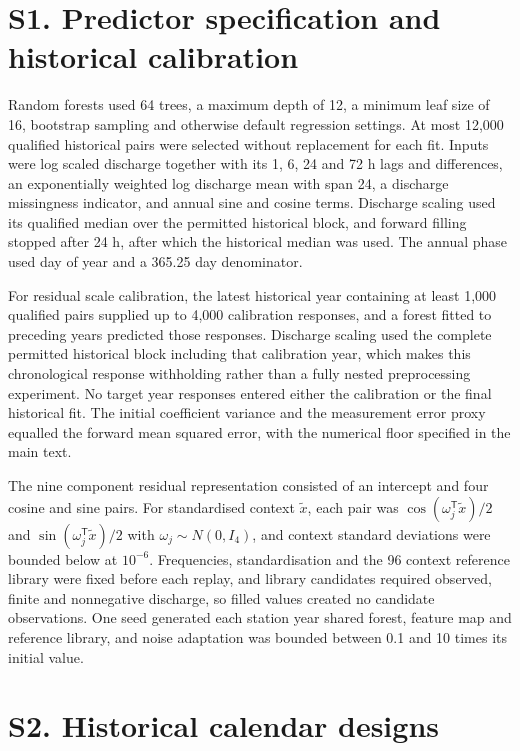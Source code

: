 \documentclass[lineno,pdflatex,sn-apa]{sn-jnl}%
\theoremstyle{thmstyleone}%
\theoremstyle{thmstyletwo}%
\theoremstyle{thmstylethree}%
\begin{document}
\section*{S1. Predictor specification and historical calibration}

Random forests used 64 trees, a maximum depth of 12, a minimum leaf size of 16, bootstrap sampling and otherwise default regression settings. At most 12,000 qualified historical pairs were selected without replacement for each fit. Inputs were log scaled discharge together with its 1, 6, 24 and 72 h lags and differences, an exponentially weighted log discharge mean with span 24, a discharge missingness indicator, and annual sine and cosine terms. Discharge scaling used its qualified median over the permitted historical block, and forward filling stopped after 24 h, after which the historical median was used. The annual phase used day of year and a 365.25 day denominator.

For residual scale calibration, the latest historical year containing at least 1,000 qualified pairs supplied up to 4,000 calibration responses, and a forest fitted to preceding years predicted those responses. Discharge scaling used the complete permitted historical block including that calibration year, which makes this chronological response withholding rather than a fully nested preprocessing experiment. No target year responses entered either the calibration or the final historical fit. The initial coefficient variance and the measurement error proxy equalled the forward mean squared error, with the numerical floor specified in the main text.

The nine component residual representation consisted of an intercept and four cosine and sine pairs. For standardised context $\widetilde x$, each pair was $\cos(\omega_j^\mathsf T\widetilde x)/2$ and $\sin(\omega_j^\mathsf T\widetilde x)/2$ with $\omega_j\sim N(0,I_4)$, and context standard deviations were bounded below at $10^{-6}$. Frequencies, standardisation and the 96 context reference library were fixed before each replay, and library candidates required observed, finite and nonnegative discharge, so filled values created no candidate observations. One seed generated each station year shared forest, feature map and reference library, and noise adaptation was bounded between 0.1 and 10 times its initial value.

\section*{S2. Historical calendar designs}
\end{document}
